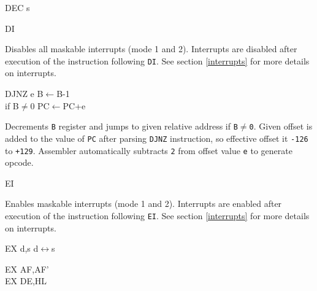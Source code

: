 \documentclass[twoside,openright,a4paper]{book}
\begin{document}
\begin{basedescript}{
	\desclabelstyle{\multilinelabel}
	\desclabelwidth{3cm}}
\begin{detailitem}{DEC s}
	\end{detailitem}

	\begin{detailitem}{DI}
		{}

		Disables all maskable interrupts (mode 1 and 2). Interrupts are disabled after execution of the instruction following {\tt DI}. See section \ref{interrupts} for more details on interrupts.
		
		\DetailNoEffect
				
		\begin{DetailTiming}
		\end{DetailTiming}

	\end{detailitem}

	\begin{detailitem}{DJNZ e}
		{B$\leftarrow$B-1\\
		if B$\not=$0 PC$\leftarrow$PC+e}

		Decrements {\tt B} register and jumps to given relative address if {\tt B$\not=$0}. Given offset is added to the value of {\tt PC} after parsing {\tt DJNZ} instruction, so effective offset it {\tt -126} to {\tt +129}. Assembler automatically subtracts {\tt 2} from offset value {\tt e} to generate opcode.

		\DetailNoEffect
				
		\begin{DetailTiming}
			\DetailTime{B=0}{2}{8}
			\DetailTime{B$\not=$0}{3}{13}
		\end{DetailTiming}

	\end{detailitem}

	\begin{detailitem}{EI}
		{}

		Enables maskable interrupts (mode 1 and 2). Interrupts are enabled after execution of the instruction following {\tt EI}. See section \ref{interrupts} for more details on interrupts.

		\DetailNoEffect
				
		\begin{DetailTiming}
			\DetailTime{}{1}{4}
		\end{DetailTiming}

	\end{detailitem}

	\begin{detailitem}{EX d,s}
		{d$\leftrightarrow$s}

		\begin{DetailVariants}
			EX AF,AF'\\
			EX DE,HL


\end{DetailVariants}
\end{detailitem}
\end{basedescript}
\end{document}
